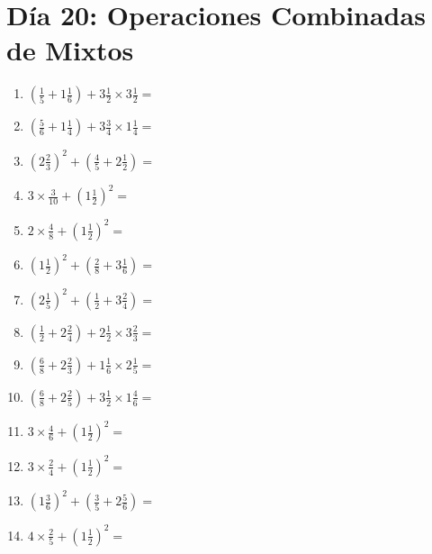 \documentclass[12pt]{article}
\begin{document}
\section*{Día 20: Operaciones Combinadas de Mixtos}
\begin{enumerate}
\item \large $ (\frac{1}{5} + 1 \frac{1}{6}) + 3 \frac{1}{2} \times 3 \frac{1}{2} = $ \vspace{1.8cm}
\item \large $ (\frac{5}{6} + 1 \frac{1}{4}) + 3 \frac{3}{4} \times 1 \frac{1}{4} = $ \vspace{1.8cm}
\item \large $ (2 \frac{2}{3})^2 + (\frac{4}{5} + 2 \frac{1}{2}) = $ \vspace{1.8cm}
\item \large $ 3 \times \frac{3}{10} + (1 \frac{1}{2})^2 = $ \vspace{1.8cm}
\item \large $ 2 \times \frac{4}{8} + (1 \frac{1}{2})^2 = $ \vspace{1.8cm}
\item \large $ (1 \frac{1}{2})^2 + (\frac{2}{8} + 3 \frac{1}{6}) = $ \vspace{1.8cm}
\item \large $ (2 \frac{1}{5})^2 + (\frac{1}{2} + 3 \frac{2}{4}) = $ \vspace{1.8cm}
\item \large $ (\frac{1}{2} + 2 \frac{2}{4}) + 2 \frac{1}{2} \times 3 \frac{2}{3} = $ \vspace{1.8cm}
\item \large $ (\frac{6}{8} + 2 \frac{2}{3}) + 1 \frac{1}{6} \times 2 \frac{1}{5} = $ \vspace{1.8cm}
\item \large $ (\frac{6}{8} + 2 \frac{2}{5}) + 3 \frac{1}{2} \times 1 \frac{4}{6} = $ \vspace{1.8cm}
\newpage
\item \large $ 3 \times \frac{4}{6} + (1 \frac{1}{2})^2 = $ \vspace{1.8cm}
\item \large $ 3 \times \frac{2}{4} + (1 \frac{1}{2})^2 = $ \vspace{1.8cm}
\item \large $ (1 \frac{3}{6})^2 + (\frac{3}{5} + 2 \frac{5}{6}) = $ \vspace{1.8cm}
\item \large $ 4 \times \frac{2}{5} + (1 \frac{1}{2})^2 = $ \vspace{1.8cm}

\end{enumerate}
\end{document}
